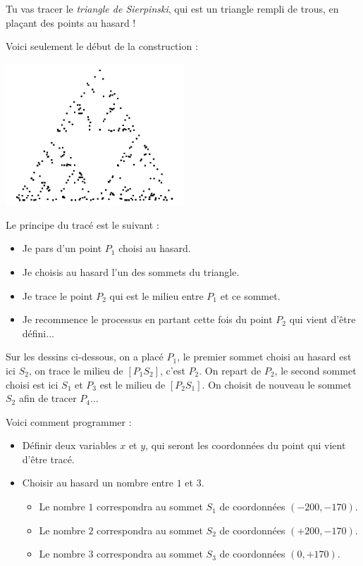 \documentclass[class=report,crop=false, 12pt]{standalone}
\begin{document}
\begin{activite}

Tu vas tracer le \emph{triangle de Sierpinski}, qui est un triangle rempli de trous, en plaçant des points au hasard !

Voici seulement le début de la construction :
\begin{center}
  \includegraphics[width=0.5\textwidth]{ecran-06-ex2} 
\end{center}

Le principe du tracé est le suivant :
\begin{itemize}
  \item Je pars d'un point $P_1$ choisi au hasard.
  \item Je choisis au hasard l'un des sommets du triangle.
  \item Je trace le point $P_2$ qui est le milieu entre $P_1$ et ce sommet.
  \item Je recommence le processus en partant cette fois du point $P_2$ qui vient d'être défini...
\end{itemize}

Sur les dessins ci-dessous, on a placé $P_1$, le premier sommet choisi au hasard est ici $S_2$, on trace le milieu de $[P_1S_2]$, c'est $P_2$. On repart de $P_2$, le second sommet choisi est ici $S_1$ et $P_3$ est le milieu de $[P_2S_1]$. On choisit de nouveau le sommet $S_2$ afin de tracer $P_4$...


Voici comment programmer :
\begin{itemize}
  \item Définir deux variables $x$ et $y$, qui seront les coordonnées du point qui vient d'être tracé.
  
  \item Choisir au hasard un nombre entre $1$ et $3$.
  \begin{itemize}
    \item Le nombre $1$ correspondra au sommet $S_1$ de coordonnées $(-200,-170)$.
    \item Le nombre $2$ correspondra au sommet $S_2$ de coordonnées $(+200,-170)$.
    \item Le nombre $3$ correspondra au sommet $S_3$ de coordonnées $(0,+170)$.        
  \end{itemize}
    

\end{itemize}
\end{activite}
\end{document}
